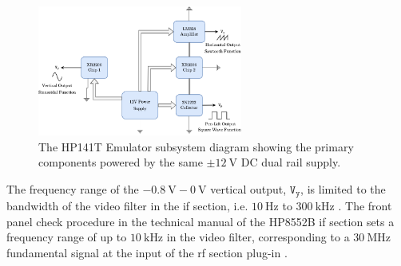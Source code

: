\documentclass[class=report,11pt,crop=false]{standalone}
\begin{document}
	\begin{figure}[ht!]
		\centering
		\includegraphics[width=0.60\textwidth]{Figures/Methodology/hp141t-emulator-subsystem-diagram}
		\caption{The HP141T Emulator subsystem diagram showing the primary components powered by the same $\pm\SI{12}{\volt}$ DC dual rail supply.}
		\label{fig:hp141t-emulator-subsystem-diagram}
	\end{figure}
	
	The frequency range of the $\SI{-0.8}{\volt}-\SI{0}{\volt}$ vertical output, $\texttt{V}_\texttt{y}$, is limited to the bandwidth of the video filter in the \acrshort{if} section, i.e. $\SI{10}{\hertz}$ to $\SI{300}{\kilo\hertz}$ \cite{hp8552b}. The front panel check procedure in the technical manual of the HP8552B \acrshort{if} section sets a frequency range of up to $\SI{10}{\kilo\hertz}$ in the video filter, corresponding to a $\SI{30}{\mega\hertz}$ fundamental signal at the input of the \acrshort{rf} section plug-in \cite{HP8555A}.  
	
\end{document}
